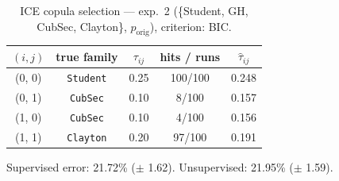 \begin{table}[htbp]
  \centering
  \caption{ICE copula selection — exp.\ 2 (\{Student, GH, CubSec, Clayton\}, $p_{\text{orig}}$), criterion: BIC.}
  \label{tab:exp3-exp2_orig_p__bic}
  \begin{tabular}{ccccc}
    \toprule
    $(i, j)$ & true family & $\tau_{ij}$ & hits / runs & $\hat\tau_{ij}$ \\
    \midrule
    (0, 0) & \texttt{Student} & 0.25 & 100/100 & 0.248 \\
    (0, 1) & \texttt{CubSec} & 0.10 & 8/100 & 0.157 \\
    (1, 0) & \texttt{CubSec} & 0.10 & 4/100 & 0.156 \\
    (1, 1) & \texttt{Clayton} & 0.20 & 97/100 & 0.191 \\
    \bottomrule
  \end{tabular}
  \par\smallskip Supervised error: 21.72\% ($\pm$ 1.62). Unsupervised: 21.95\% ($\pm$ 1.59).
\end{table}
